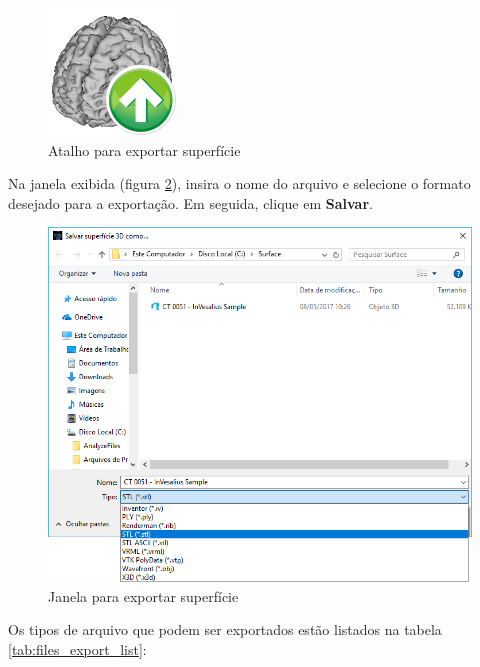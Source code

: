 \begin{figure}[!htb]
\centering
\includegraphics[scale=0.2]{../user_guide_figures/icons/surface_export_original.png}
\caption{Atalho para exportar superfície}
\label{fig:surface_export_original}
\end{figure}

Na janela exibida (figura \ref{fig:export_data_window}), insira o nome do arquivo e
selecione o formato desejado para a exportação. Em seguida, clique em \textbf{Salvar}.


\begin{figure}[!htb]
\centering
\includegraphics[scale=0.4]{../user_guide_figures/invesalius_screen/export_surface.png}
\caption{Janela para exportar superfície}
\label{fig:export_data_window}
\end{figure}

Os tipos de arquivo que podem ser exportados estão listados na tabela
\ref{tab:files_export_list}:

